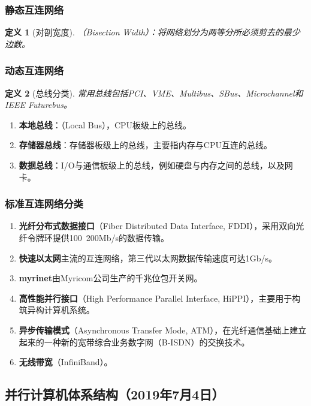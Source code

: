 \documentclass{article}
\newtheorem{definition}{定义}[section]
\begin{document}
			\subsubsection{静态互连网络}
				\begin{definition}[对剖宽度]
					（Bisection Width）：将网络划分为两等分所必须剪去的最少边数。
				\end{definition}
			\subsubsection{动态互连网络}
				\begin{definition}[总线分类]
					常用总线包括PCI、VME、Multibus、SBus、Microchannel和IEEE Futurebus。
				\end{definition}
				\begin{enumerate}
					\item \textbf{本地总线}：（Local Bus），CPU板级上的总线。
					\item \textbf{存储器总线}：存储器板级上的总线，主要指内存与CPU互连的总线。
					\item \textbf{数据总线}：I/O与通信板级上的总线，例如硬盘与内存之间的总线，以及网卡。
				\end{enumerate}
			\subsubsection{标准互连网络分类}
				\begin{enumerate}
					\item \textbf{光纤分布式数据接口}（Fiber Distributed Data Interface, FDDI），采用双向光纤令牌环提供100~200Mb/s的数据传输。
					\item \textbf{快速以太网}主流的互连网络，第三代以太网数据传输速度可达1Gb/s。
					\item \textbf{myrinet}由Myricom公司生产的千兆位包开关网。
					\item \textbf{高性能并行接口}（High Performance Parallel Interface, HiPPI），主要用于构筑异构计算机系统。
					\item \textbf{异步传输模式}（Asynchronous Transfer Mode, ATM），在光纤通信基础上建立起来的一种新的宽带综合业务数字网（B-ISDN）的交换技术。
					\item \textbf{无线带宽}（InfiniBand）。
				\end{enumerate}
		\subsection{并行计算机体系结构（2019年7月4日）}
\end{document}

